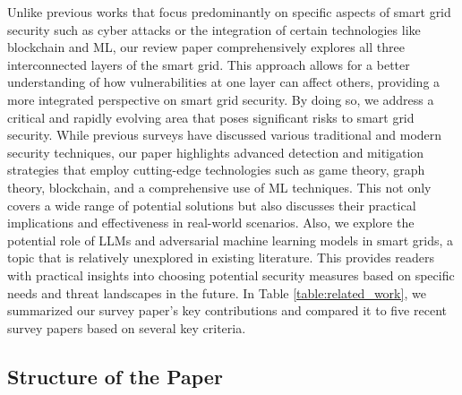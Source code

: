 \documentclass[10pt, journal]{IEEEtran}
\begin{document}
Unlike previous works that focus predominantly on specific aspects of smart grid security such as cyber attacks or the integration of certain technologies like blockchain and ML, our review paper comprehensively explores all three interconnected layers of the smart grid. This approach allows for a better understanding of how vulnerabilities at one layer can affect others, providing a more integrated perspective on smart grid security. By doing so, we address a critical and rapidly evolving area that poses significant risks to smart grid security. While previous surveys have discussed various traditional and modern security techniques, our paper highlights advanced detection and mitigation strategies that employ cutting-edge technologies such as game theory, graph theory, blockchain, and a comprehensive use of ML techniques. This not only covers a wide range of potential solutions but also discusses their practical implications and effectiveness in real-world scenarios. Also, we explore the potential role of LLMs and adversarial machine learning models in smart grids, a topic that is relatively unexplored in existing literature. This provides readers with practical insights into choosing potential security measures based on specific needs and threat landscapes in the future. In Table \ref{table:related_work}, we summarized our survey paper's key contributions and compared it to five recent survey papers based on several key criteria.

\subsection{Structure of the Paper}


\end{document}
